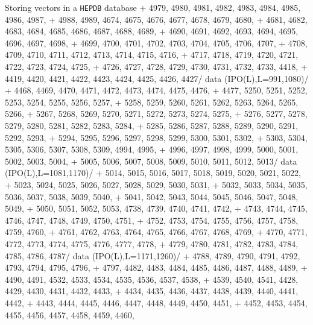 \begin{XMPt}{Storing vectors in a {\tt HEPDB} database}
     +  4979,  4980,  4981,  4982,  4983,  4984,  4985,  4986,  4987,
     +  4988,  4989,  4674,  4675,  4676,  4677,  4678,  4679,  4680,
     +  4681,  4682,  4683,  4684,  4685,  4686,  4687,  4688,  4689,
     +  4690,  4691,  4692,  4693,  4694,  4695,  4696,  4697,  4698,
     +  4699,  4700,  4701,  4702,  4703,  4704,  4705,  4706,  4707,
     +  4708,  4709,  4710,  4711,  4712,  4713,  4714,  4715,  4716,
     +  4717,  4718,  4719,  4720,  4721,  4722,  4723,  4724,  4725,
     +  4726,  4727,  4728,  4729,  4730,  4731,  4732,  4733,  4418,
     +  4419,  4420,  4421,  4422,  4423,  4424,  4425,  4426,  4427/
      data (IPO(L),L=991,1080)/
     +  4468,  4469,  4470,  4471,  4472,  4473,  4474,  4475,  4476,
     +  4477,  5250,  5251,  5252,  5253,  5254,  5255,  5256,  5257,
     +  5258,  5259,  5260,  5261,  5262,  5263,  5264,  5265,  5266,
     +  5267,  5268,  5269,  5270,  5271,  5272,  5273,  5274,  5275,
     +  5276,  5277,  5278,  5279,  5280,  5281,  5282,  5283,  5284,
     +  5285,  5286,  5287,  5288,  5289,  5290,  5291,  5292,  5293,
     +  5294,  5295,  5296,  5297,  5298,  5299,  5300,  5301,  5302,
     +  5303,  5304,  5305,  5306,  5307,  5308,  5309,  4994,  4995,
     +  4996,  4997,  4998,  4999,  5000,  5001,  5002,  5003,  5004,
     +  5005,  5006,  5007,  5008,  5009,  5010,  5011,  5012,  5013/
      data (IPO(L),L=1081,1170)/
     +  5014,  5015,  5016,  5017,  5018,  5019,  5020,  5021,  5022,
     +  5023,  5024,  5025,  5026,  5027,  5028,  5029,  5030,  5031,
     +  5032,  5033,  5034,  5035,  5036,  5037,  5038,  5039,  5040,
     +  5041,  5042,  5043,  5044,  5045,  5046,  5047,  5048,  5049,
     +  5050,  5051,  5052,  5053,  4738,  4739,  4740,  4741,  4742,
     +  4743,  4744,  4745,  4746,  4747,  4748,  4749,  4750,  4751,
     +  4752,  4753,  4754,  4755,  4756,  4757,  4758,  4759,  4760,
     +  4761,  4762,  4763,  4764,  4765,  4766,  4767,  4768,  4769,
     +  4770,  4771,  4772,  4773,  4774,  4775,  4776,  4777,  4778,
     +  4779,  4780,  4781,  4782,  4783,  4784,  4785,  4786,  4787/
      data (IPO(L),L=1171,1260)/
     +  4788,  4789,  4790,  4791,  4792,  4793,  4794,  4795,  4796,
     +  4797,  4482,  4483,  4484,  4485,  4486,  4487,  4488,  4489,
     +  4490,  4491,  4532,  4533,  4534,  4535,  4536,  4537,  4538,
     +  4539,  4540,  4541,  4428,  4429,  4430,  4431,  4432,  4433,
     +  4434,  4435,  4436,  4437,  4438,  4439,  4440,  4441,  4442,
     +  4443,  4444,  4445,  4446,  4447,  4448,  4449,  4450,  4451,
     +  4452,  4453,  4454,  4455,  4456,  4457,  4458,  4459,  4460,

\end{XMPt}
